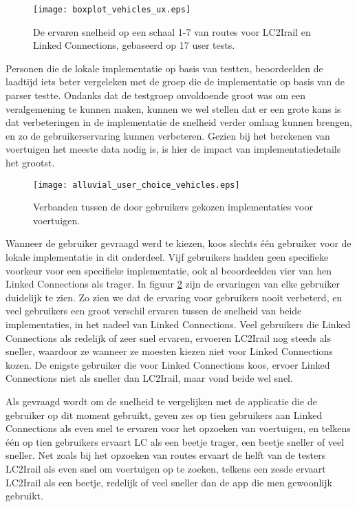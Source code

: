 \begin{figure}[h]
	\centering
	\texttt{[image: boxplot\_vehicles\_ux.eps]}
	\caption[Ervaren snelheid van routes]{De ervaren snelheid op een schaal 1-7 van routes voor LC2Irail en Linked Connections, gebaseerd op 17 user tests.}
	\label{fig:vehiclesUx}
\end{figure}

Personen die de lokale implementatie op basis van  testten, beoordeelden de laadtijd iets beter vergeleken met de groep die de implementatie op basis van de  parser testte. Ondanks dat de testgroep onvoldoende groot was om een veralgemening te kunnen maken, kunnen we wel stellen dat er een grote kans is dat verbeteringen in de implementatie de snelheid verder omlaag kunnen brengen, en zo de gebruikerservaring kunnen verbeteren. Gezien bij het berekenen van voertuigen het meeste data nodig is, is hier de impact van implementatiedetails het grootst.

\begin{figure}[ht]
	\centering
	\texttt{[image: alluvial\_user\_choice\_vehicles.eps]}
	\caption[Door gebruikers gekozen implementatie voor voertuigen]{Verbanden tussen de door gebruikers gekozen implementaties voor voertuigen. }
	\label{fig:alluvialUserChoicesVehicles}
\end{figure}

Wanneer de gebruiker gevraagd werd te kiezen, koos slechts één gebruiker voor de lokale implementatie in dit onderdeel. Vijf gebruikers hadden geen specifieke voorkeur voor een specifieke implementatie, ook al beoordeelden vier van hen Linked Connections als trager. In figuur \ref{fig:alluvialUserChoicesVehicles} zijn de ervaringen van elke gebruiker duidelijk te zien. Zo zien we dat de ervaring voor gebruikers nooit verbeterd, en veel gebruikers een groot verschil ervaren tussen de snelheid van beide implementaties, in het nadeel van Linked Connections. Veel gebruikers die Linked Connections als redelijk of zeer snel ervaren, ervoeren LC2Irail nog steeds als sneller, waardoor ze wanneer ze moesten kiezen niet voor Linked Connections kozen. De enigste gebruiker die voor Linked Connections koos, ervoer Linked Connections niet als sneller dan LC2Irail, maar vond beide wel snel.

Als gevraagd wordt om de snelheid te vergelijken met de applicatie die de gebruiker op dit moment gebruikt, geven zes op tien gebruikers aan Linked Connections als even snel te ervaren voor het opzoeken van voertuigen, en telkens één op tien gebruikers ervaart LC als een beetje trager, een beetje sneller of veel sneller. Net zoals bij het opzoeken van routes ervaart de helft van de testers LC2Irail als even snel om voertuigen op te zoeken, telkens een zesde ervaart LC2Irail als een beetje, redelijk of veel sneller dan de app die men gewoonlijk gebruikt.

